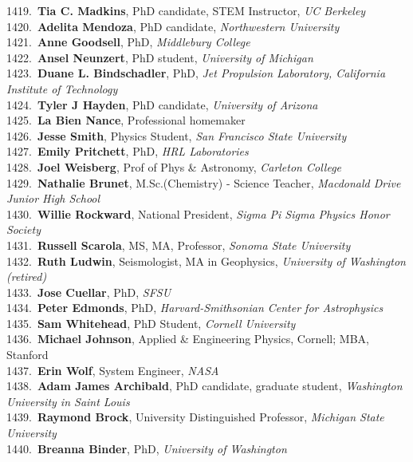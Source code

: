1419.~{\bf Tia C. Madkins}, PhD candidate, STEM Instructor, {\sl UC Berkeley} \\
1420.~{\bf Adelita Mendoza}, PhD candidate, {\sl Northwestern University } \\
1421.~{\bf Anne Goodsell}, PhD, {\sl Middlebury College} \\
1422.~{\bf Ansel Neunzert}, PhD student, {\sl University of Michigan} \\
1423.~{\bf Duane L. Bindschadler}, PhD, {\sl Jet Propulsion Laboratory, California Institute of Technology} \\
1424.~{\bf Tyler J Hayden}, PhD candidate, {\sl University of Arizona} \\
1425.~{\bf La Bien Nance}, Professional homemaker \\
1426.~{\bf Jesse Smith}, Physics Student, {\sl San Francisco State University} \\
1427.~{\bf Emily Pritchett}, PhD, {\sl HRL Laboratories} \\
1428.~{\bf Joel Weisberg}, Prof of Phys \& Astronomy, {\sl Carleton College} \\
1429.~{\bf Nathalie Brunet}, M.Sc.(Chemistry) - Science Teacher, {\sl Macdonald Drive Junior High School} \\
1430.~{\bf Willie Rockward}, National President, {\sl Sigma Pi Sigma Physics Honor Society} \\
1431.~{\bf Russell Scarola}, MS, MA, Professor, {\sl Sonoma State University} \\
1432.~{\bf Ruth Ludwin}, Seismologist, MA in Geophysics, {\sl University of Washington (retired)} \\
1433.~{\bf Jose Cuellar}, PhD, {\sl SFSU} \\
1434.~{\bf Peter Edmonds}, PhD, {\sl Harvard-Smithsonian Center for Astrophysics} \\
1435.~{\bf Sam Whitehead}, PhD Student, {\sl Cornell University} \\
1436.~{\bf Michael Johnson}, Applied \& Engineering Physics, Cornell; MBA, Stanford \\
1437.~{\bf Erin Wolf}, System Engineer, {\sl NASA} \\
1438.~{\bf Adam James Archibald}, PhD candidate, graduate student, {\sl Washington University in Saint Louis} \\
1439.~{\bf Raymond Brock}, University Distinguished Professor, {\sl Michigan State University} \\
1440.~{\bf Breanna Binder}, PhD, {\sl University of Washington} \\
